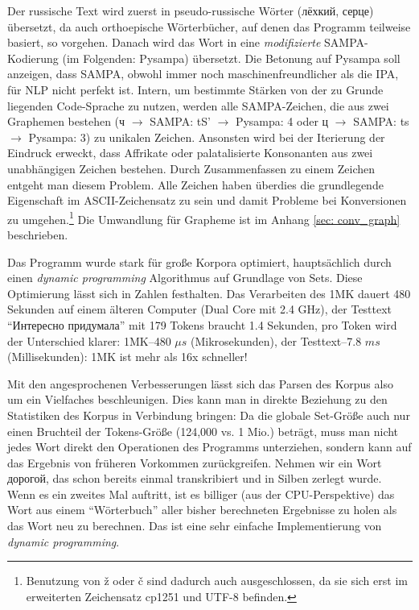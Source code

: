 \documentclass[12pt,headsepline,a4paper]{scrartcl}
\newcommand\textcyr[1]{{\fontencoding{OT2}\fontfamily{wncyr}\selectfont #1}}
\begin{document}
Der russische Text wird zuerst in pseudo-russische Wörter (\textcyr{лёхкий, серце}) übersetzt, da auch orthoepische Wörterbücher, auf denen das Programm teilweise basiert, so vorgehen. Danach wird das Wort in eine \textit{modifizierte} SAMPA-Kodierung (im Folgenden: Pysampa) übersetzt. Die Betonung auf Pysampa soll anzeigen, dass SAMPA, obwohl immer noch maschinenfreundlicher als die IPA, für NLP nicht perfekt ist. Intern, um bestimmte Stärken von der zu Grunde liegenden Code-Sprache zu nutzen, werden alle SAMPA-Zeichen, die aus zwei Graphemen bestehen (\textcyr{ч} $\to$ SAMPA: tS' $\to$ Pysampa: 4 oder \textcyr{ц} $\to$ SAMPA: ts $\to$ Pysampa: 3) zu unikalen Zeichen. Ansonsten wird bei der Iterierung der Eindruck erweckt, dass Affrikate oder palatalisierte Konsonanten aus zwei unabhängigen Zeichen bestehen. Durch Zusammenfassen zu einem Zeichen entgeht man diesem Problem. Alle Zeichen haben überdies die grundlegende Eigenschaft im ASCII-Zeichensatz zu sein und damit Probleme bei Konversionen zu umgehen.\footnote{Benutzung von ž oder č sind dadurch auch ausgeschlossen, da sie sich erst im erweiterten Zeichensatz cp1251 und UTF-8 befinden.} Die Umwandlung für Grapheme ist im Anhang \ref{sec: conv_graph} beschrieben.

Das Programm wurde stark für große Korpora optimiert, hauptsächlich durch einen \textit{dynamic programming} Algorithmus auf Grundlage von Sets.
Diese Optimierung lässt sich in Zahlen festhalten. Das Verarbeiten des 1MK dauert 480 Sekunden auf einem älteren Computer (Dual Core mit 2.4 GHz), der Testtext "`\textcyr{Интересно придумала}"' mit 179 Tokens braucht 1.4 Sekunden, pro Token wird der Unterschied klarer: 1MK--480 $\mu s$ (Mikrosekunden), der Testtext--7.8 $ms$ (Millisekunden): 1MK ist mehr als 16x schneller!

Mit den angesprochenen Verbesserungen lässt sich das Parsen des Korpus also um ein Vielfaches beschleunigen. Dies kann man in direkte Beziehung zu den Statistiken des Korpus in Verbindung bringen: Da die globale Set-Größe auch nur einen Bruchteil
der Tokens-Größe (124,000 vs. 1 Mio.) beträgt, muss man nicht jedes Wort direkt den Operationen des Programms unterziehen, sondern kann auf das Ergebnis von früheren Vorkommen zurückgreifen. Nehmen wir ein Wort \textcyr{дорогой}, das schon bereits einmal transkribiert und in Silben zerlegt wurde. Wenn es ein zweites Mal auftritt, ist es billiger (aus der CPU-Perspektive) das Wort aus einem "`Wörterbuch"' aller bisher berechneten Ergebnisse zu holen als das Wort neu zu berechnen. Das ist eine sehr einfache Implementierung von \textit{dynamic programming}.
\end{document}
